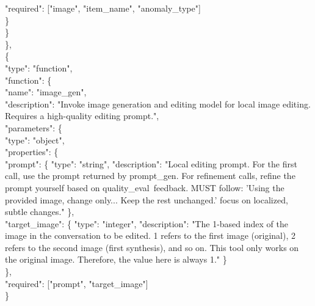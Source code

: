 \documentclass[sigconf]{acmart}
\begin{document}
\begin{tcolorbox}
\hspace*{4em}"required": {[}"image", "item\_name", "anomaly\_type"{]} \\
\hspace*{3em}\} \\
\hspace*{2em}\} \\
\hspace*{1em}\}, \\
\hspace*{1em}\{ \\
\hspace*{2em}"type": "function", \\
\hspace*{2em}"function": \{ \\
\hspace*{3em}"name": "image\_gen", \\
\hspace*{3em}"description": "Invoke image generation and editing model for local image editing. Requires a high-quality editing prompt.", \\
\hspace*{3em}"parameters": \{ \\
\hspace*{4em}"type": "object", \\
\hspace*{4em}"properties": \{ \\
\hspace*{5em}"prompt": \{ "type": "string", "description": "Local editing prompt. For the first call, use the prompt returned by \textquotesingle prompt\_gen\textquotesingle. For refinement calls, refine the prompt yourself based on \textquotesingle quality\_eval\textquotesingle \ feedback. MUST follow: 'Using the provided image, change only... Keep the rest unchanged.' focus on localized, subtle changes." \}, \\
\hspace*{5em}"target\_image": \{ "type": "integer", "description": "The 1-based index of the image in the conversation to be edited. 1 refers to the first image (original), 2 refers to the second image (first synthesis), and so on. This tool only works on the original image. Therefore, the value here is always 1." \} \\
\hspace*{4em}\}, \\
\hspace*{4em}"required": {["prompt", "target\_image"]} \\
\hspace*{3em}\} \\

\end{tcolorbox}
\end{document}
